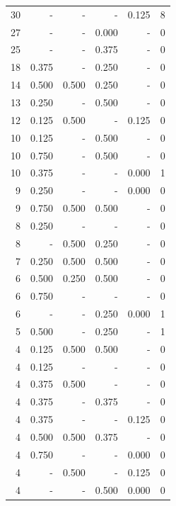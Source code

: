 \documentclass[a4paper]{article}\usepackage{graphicx, color}
\begin{document}
\begin{table}[ht]
\begin{tabular}{rrrrrr}
   \rowcolor{nullColor} 30 & - & - & - & 0.125 & 8 \\ 
   \rowcolor{sosoColor} 27 & - & - & 0.000 & - & 0 \\ 
   \rowcolor{sosoColor} 25 & - & - & 0.375 & - & 0 \\ 
   \rowcolor{sosoColor} 18 & 0.375 & - & 0.250 & - & 0 \\ 
   \rowcolor{badColor} 14 & 0.500 & 0.500 & 0.250 & - & 0 \\ 
   \rowcolor{sosoColor} 13 & 0.250 & - & 0.500 & - & 0 \\ 
  12 & 0.125 & 0.500 & - & 0.125 & 0 \\ 
   \rowcolor{sosoColor} 10 & 0.125 & - & 0.500 & - & 0 \\ 
   \rowcolor{sosoColor} 10 & 0.750 & - & 0.500 & - & 0 \\ 
   \rowcolor{nullColor} 10 & 0.375 & - & - & 0.000 & 1 \\ 
   \rowcolor{nullColor} 9 & 0.250 & - & - & 0.000 & 0 \\ 
   \rowcolor{goodColor} 9 & 0.750 & 0.500 & 0.500 & - & 0 \\ 
   \rowcolor{nullColor} 8 & 0.250 & - & - & - & 0 \\ 
   \rowcolor{badColor} 8 & - & 0.500 & 0.250 & - & 0 \\ 
   \rowcolor{goodColor} 7 & 0.250 & 0.500 & 0.500 & - & 0 \\ 
   \rowcolor{badColor} 6 & 0.500 & 0.250 & 0.500 & - & 0 \\ 
   \rowcolor{nullColor} 6 & 0.750 & - & - & - & 0 \\ 
   \rowcolor{sosoColor} 6 & - & - & 0.250 & 0.000 & 1 \\ 
   \rowcolor{sosoColor} 5 & 0.500 & - & 0.250 & - & 1 \\ 
   \rowcolor{goodColor} 4 & 0.125 & 0.500 & 0.500 & - & 0 \\ 
   \rowcolor{nullColor} 4 & 0.125 & - & - & - & 0 \\ 
  4 & 0.375 & 0.500 & - & - & 0 \\ 
   \rowcolor{sosoColor} 4 & 0.375 & - & 0.375 & - & 0 \\ 
   \rowcolor{nullColor} 4 & 0.375 & - & - & 0.125 & 0 \\ 
  4 & 0.500 & 0.500 & 0.375 & - & 0 \\ 
   \rowcolor{nullColor} 4 & 0.750 & - & - & 0.000 & 0 \\ 
  4 & - & 0.500 & - & 0.125 & 0 \\ 
   \rowcolor{sosoColor} 4 & - & - & 0.500 & 0.000 & 0 \\ 

\end{tabular}
\end{table}
\end{document}
